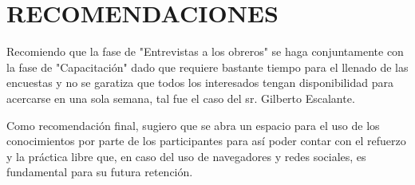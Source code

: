 \chapter*{RECOMENDACIONES}
    Recomiendo que la fase de "Entrevistas a los obreros" se haga conjuntamente con la fase de "Capacitación" dado que requiere bastante tiempo para el llenado de las encuestas y no se garatiza que todos los interesados tengan disponibilidad para acercarse en una sola semana, tal fue el caso del sr. Gilberto Escalante.
    
    Como recomendación final, sugiero que se abra un espacio para el uso de los conocimientos por parte de los participantes para así poder contar con el refuerzo y la práctica libre que, en caso del uso de navegadores y redes sociales, es fundamental para su futura retención.
    
    \pagebreak